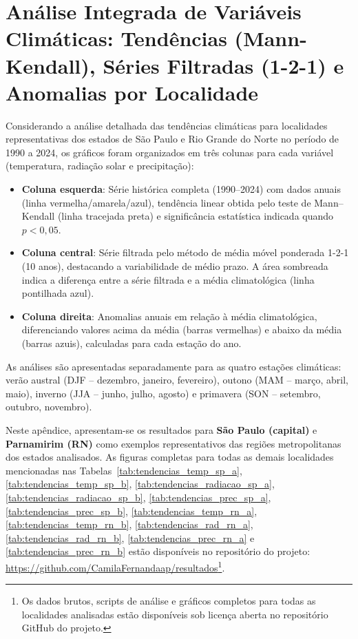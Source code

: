 \chapter{Análise Integrada de Variáveis Climáticas: Tendências (Mann-Kendall), Séries Filtradas (1-2-1) e Anomalias por Localidade}
\label{ap01}

Considerando a análise detalhada das tendências climáticas para localidades representativas dos estados de São Paulo e Rio Grande do Norte no período de 1990 a 2024, os gráficos foram organizados em três colunas para cada variável (temperatura, radiação solar e precipitação):

\begin{itemize}
	\item \textbf{Coluna esquerda}: Série histórica completa (1990--2024) com dados anuais (linha vermelha/amarela/azul), tendência linear obtida pelo teste de Mann--Kendall (linha tracejada preta) e significância estatística indicada quando $p < 0{,}05$.
	
	\item \textbf{Coluna central}: Série filtrada pelo método de média móvel ponderada 1-2-1 (10 anos), destacando a variabilidade de médio prazo. A área sombreada indica a diferença entre a série filtrada e a média climatológica (linha pontilhada azul).
	
	\item \textbf{Coluna direita}: Anomalias anuais em relação à média climatológica, diferenciando valores acima da média (barras vermelhas) e abaixo da média (barras azuis), calculadas para cada estação do ano.
\end{itemize}

As análises são apresentadas separadamente para as quatro estações climáticas: verão austral (DJF -- dezembro, janeiro, fevereiro), outono (MAM -- março, abril, maio), inverno (JJA -- junho, julho, agosto) e primavera (SON -- setembro, outubro, novembro).

Neste apêndice, apresentam-se os resultados para \textbf{São Paulo (capital)} e \textbf{Parnamirim (RN)} como exemplos representativos das regiões metropolitanas dos estados analisados. As figuras completas para todas as demais localidades mencionadas nas Tabelas~\ref{tab:tendencias_temp_sp_a}, \ref{tab:tendencias_temp_sp_b}, \ref{tab:tendencias_radiacao_sp_a}, \ref{tab:tendencias_radiacao_sp_b}, \ref{tab:tendencias_prec_sp_a}, \ref{tab:tendencias_prec_sp_b}, \ref{tab:tendencias_temp_rn_a}, \ref{tab:tendencias_temp_rn_b}, \ref{tab:tendencias_rad_rn_a}, \ref{tab:tendencias_rad_rn_b}, \ref{tab:tendencias_prec_rn_a} e \ref{tab:tendencias_prec_rn_b}  estão disponíveis no repositório do projeto: \url{https://github.com/CamilaFernandaap/resultados}\footnote{Os dados brutos, scripts de análise e gráficos completos para todas as localidades analisadas estão disponíveis sob licença aberta no repositório GitHub do projeto.}.

